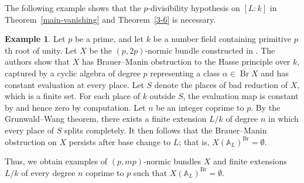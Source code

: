 \documentclass[10pt]{amsart}
\theoremstyle{plain}
\theoremstyle{definition}
\newtheorem{example}[thm]{Example}
\newcommand{\A}{{\mathbb A}}
\newcommand{\Br}{\operatorname{Br}}
\begin{document}
The following example shows that the \(p\)-divisibility hypothesis on \([L:k]\) in Theorem~\ref{main-vanishing} and Theorem~\ref{3-6} is necessary.

\begin{example}\label{bad place split completely implies persistence}
Let \(p\) be a prime, and let \(k\) be a number field containing primitive $p$th root of unity. Let \(X\) be the \((p,2p)\)-normic bundle constructed in \cite[Proposition~4.1]{AVB}. The authors show that \(X\) has Brauer--Manin obstruction to the Hasse principle over \(k\), captured by a cyclic algebra of degree \(p\) representing a class \(\alpha\in\overline{\Br}X\) and has constant evaluation at every place. Let \(S\) denote the places of bad reduction of \(X\), which is a finite set. For each place of \(k\) outside \(S\), the evaluation map is constant by \cite[Theorem 13.3.15]{CS} and hence zero by computation. Let \(n\) be an integer coprime to \(p\). By the Grunwald--Wang theorem, there exists a finite extension \(L/k\) of degree \(n\) in which every place of \(S\) splits completely. It then follows that the Brauer--Manin obstruction on \(X\) persists after base change to \(L\); that is, \(X(\A_L)^{\Br}=\emptyset\).

Thus, we obtain examples of \((p,mp)\)-normic bundles \(X\) and finite extensions \(L/k\) of every degree \(n\) coprime to \(p\) such that
\(X(\mathbb{A}_L)^{\Br}=\emptyset\).
\end{example}


\end{document}
